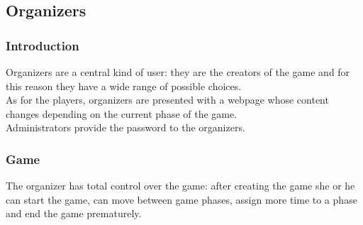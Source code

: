 \subsection{Organizers}
\subsubsection{Introduction}
Organizers are a central kind of user: they are the creators of the game and for this reason they have a wide range of possible choices.\\
As for the players, organizers are presented with a webpage whose content changes depending on the current phase of the game.\\
Administrators provide the password to the organizers.

\subsubsection{Game}
The organizer has total control over the game: after creating the game she or he can start the game, can move between game phases, assign more time to a phase and end the game prematurely.
